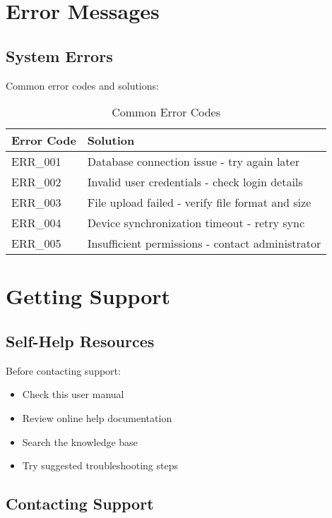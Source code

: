 \section{Error Messages}

\subsection{System Errors}

Common error codes and solutions:

\begin{table}[H]
\centering
\begin{tabular}{@{}lp{8cm}@{}}
\toprule
\textbf{Error Code} & \textbf{Solution} \\
\midrule
ERR\_001 & Database connection issue - try again later \\
ERR\_002 & Invalid user credentials - check login details \\
ERR\_003 & File upload failed - verify file format and size \\
ERR\_004 & Device synchronization timeout - retry sync \\
ERR\_005 & Insufficient permissions - contact administrator \\
\bottomrule
\end{tabular}
\caption{Common Error Codes}
\label{tab:error_codes}
\end{table}

\section{Getting Support}

\subsection{Self-Help Resources}

Before contacting support:

\begin{itemize}
    \item Check this user manual
    \item Review online help documentation
    \item Search the knowledge base
    \item Try suggested troubleshooting steps
\end{itemize}

\subsection{Contacting Support}

